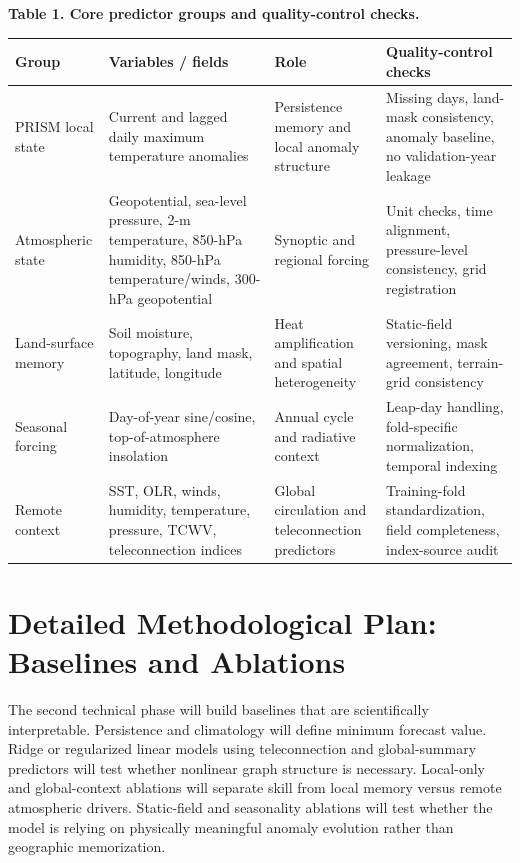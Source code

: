 \documentclass[11pt,letterpaper]{article}
\begin{document}
\begin{center}\scriptsize
\textbf{Table 1. Core predictor groups and quality-control checks.}\\[0.03in]
\begin{tabularx}{\textwidth}{p{}p{}p{}X}
\toprule
\textbf{Group} & \textbf{Variables / fields} & \textbf{Role} & \textbf{Quality-control checks}\\
\midrule
PRISM local state & Current and lagged daily maximum temperature anomalies & Persistence memory and local anomaly structure & Missing days, land-mask consistency, anomaly baseline, no validation-year leakage\\
Atmospheric state & Geopotential, sea-level pressure, 2-m temperature, 850-hPa humidity, 850-hPa temperature/winds, 300-hPa geopotential & Synoptic and regional forcing & Unit checks, time alignment, pressure-level consistency, grid registration\\
Land-surface memory & Soil moisture, topography, land mask, latitude, longitude & Heat amplification and spatial heterogeneity & Static-field versioning, mask agreement, terrain-grid consistency\\
Seasonal forcing & Day-of-year sine/cosine, top-of-atmosphere insolation & Annual cycle and radiative context & Leap-day handling, fold-specific normalization, temporal indexing\\
Remote context & SST, OLR, winds, humidity, temperature, pressure, TCWV, teleconnection indices & Global circulation and teleconnection predictors & Training-fold standardization, field completeness, index-source audit\\
\bottomrule
\end{tabularx}
\end{center}

\newpage
\section*{Detailed Methodological Plan: Baselines and Ablations}
The second technical phase will build baselines that are scientifically interpretable. Persistence and climatology will define minimum forecast value. Ridge or regularized linear models using teleconnection and global-summary predictors will test whether nonlinear graph structure is necessary. Local-only and global-context ablations will separate skill from local memory versus remote atmospheric drivers. Static-field and seasonality ablations will test whether the model is relying on physically meaningful anomaly evolution rather than geographic memorization.
\end{document}
